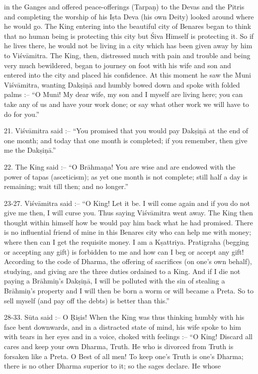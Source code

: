 in the Ganges and offered peace-offerings (Tarpa\d{n}) to the Devas and the Pitris and completing the worship of his I\d{s}ta Deva (his own Deity) looked around where he would go. The King entering into the beautiful city of Benares began to think that no human being is protecting this city but \'Siva Himself is protecting it. So if he lives there, he would not be living in a city which has been given away by him to Vi\'sv\=amitra. The King, then, distressed much with pain and trouble and being very much bewildered, began to journey on foot with his wife and son and entered into the city and placed his confidence. At this moment he saw the Muni Vi\'sv\=amitra, wanting Dak\d{s}i\d{n}\=a and humbly bowed down and spoke with folded palms :-- ``O Muni! My dear wife, my son and I myself are living here; you can take any of us and have your work done; or say what other work we will have to do for you.''

21. Vi\'sv\=amitra said :-- ``You promised that you would pay Dak\d{s}i\d{n}\=a at the end of one month; and today that one month is completed; if you remember, then give me the Dak\d{s}i\d{n}\=a.''

22. The King said :-- ``O Br\=ahma\d{n}a! You are wise and are endowed with the power of tapas (asceticism); as yet one month is not complete; still half a day is remaining; wait till then; and no longer.''

23-27. Vi\'sv\=amitra said :-- ``O King! Let it be. I will come again and if you do not give me then, I will curse you. Thus saying Vi\'sv\=amitra went away. The King then thought within himself how be would pay him back what he had promised. There is no influential friend of mine in this Benares city who can help me with money; where then can I get the requisite money. I am a K\d{s}attriya. Pratigraha (begging or accepting any gift) is forbidden to me and how can I beg or accept any gift! According to the code of Dharma, the offering of sacrifices (on one's own behalf), studying, and giving are the three duties ordained to a King. And if I die not paying a Br\=ahmi\d{n}'s Dak\d{s}i\d{n}\=a, I will be polluted with the sin of stealing a Br\=ahmi\d{n}'s property and I will then be born a worm or will became a Preta. So to sell myself (and pay off the debts) is better than this.''

28-33. S\=uta said :-- O \d{R}i\d{s}is! When the King was thus thinking humbly with his face bent downwards, and in a distracted state of mind, his wife spoke to him with tears in her eyes and in a voice, choked with feelings :-- ``O King! Discard all cares and keep your own Dharma, Truth. He who is divorced from Truth is forsaken like a Preta. O Best of all men! To keep one's Truth is one's Dharma; there is no other Dharma superior to it; so the sages declare. He whose

